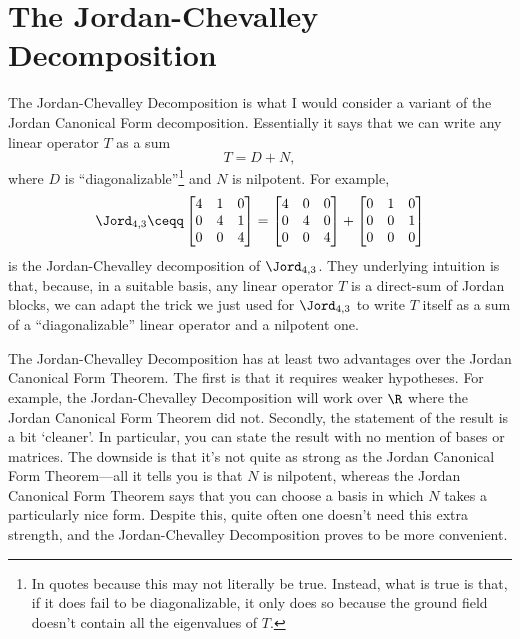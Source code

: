\section{The Jordan-Chevalley Decomposition}

The Jordan-Chevalley Decomposition is what I would consider a variant of the Jordan Canonical Form decomposition.  Essentially it says that we can write any linear operator $T$ as a sum
\begin{equation}
	T=D+N,
\end{equation}
where $D$ is ``diagonalizable''\footnote{In quotes because this may not literally be true.  Instead, what is true is that, if it does fail to be diagonalizable, it only does so because the ground field doesn't contain all the eigenvalues of $T$.} and $N$ is nilpotent.  For example,
\begin{equation}
	\Jord _{4,3}\ceqq \begin{bmatrix}4 & 1 & 0 \\ 0 & 4 & 1 \\ 0 & 0 & 4\end{bmatrix}=\begin{bmatrix}4 & 0 & 0 \\ 0 & 4 & 0 \\ 0 & 0 & 4\end{bmatrix}+\begin{bmatrix}0 & 1 & 0 \\ 0 & 0 & 1 \\ 0 & 0 & 0\end{bmatrix}
\end{equation}
is the Jordan-Chevalley decomposition of $\Jord _{4,3}$.  They underlying intuition is that, because, in a suitable basis, any linear operator $T$ is a direct-sum of Jordan blocks, we can adapt the trick we just used for $\Jord _{4,3}$ to write $T$ itself as a sum of a ``diagonalizable'' linear operator and a nilpotent one.

The Jordan-Chevalley Decomposition has at least two advantages over the Jordan Canonical Form Theorem.  The first is that it requires weaker hypotheses.  For example, the Jordan-Chevalley Decomposition will work over $\R$ where the Jordan Canonical Form Theorem did not.  Secondly, the statement of the result is a bit `cleaner'.  In particular, you can state the result with no mention of bases or matrices.  The downside is that it's not quite as strong as the Jordan Canonical Form Theorem---all it tells you is that $N$ is nilpotent, whereas the Jordan Canonical Form Theorem says that you can choose a basis in which $N$ takes a particularly nice form.  Despite this, quite often one doesn't need this extra strength, and the Jordan-Chevalley Decomposition proves to be more convenient.


